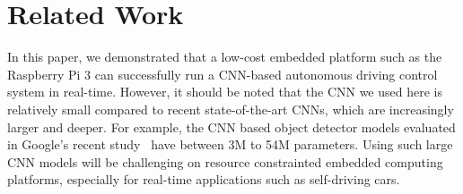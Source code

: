 \section{Related Work}


In this paper, we demonstrated that a low-cost embedded platform such
as the  Raspberry Pi 3 can successfully run a CNN-based autonomous
driving control system in real-time. However, it should be noted that
the CNN we used here is relatively small compared to recent
state-of-the-art CNNs, which are increasingly larger and deeper.
For example, the CNN based object detector models evaluated in
Google's recent study~\cite{huang2017speed} have between 3M to 54M
parameters. Using such large CNN models will be challenging on
resource constrainted embedded computing platforms, especially for
real-time applications such as self-driving cars.



